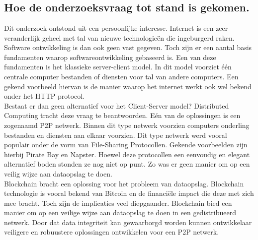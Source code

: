 
\chapter{}
\label{ch:methodologie}

\section{Hoe de onderzoeksvraag tot stand is gekomen.}
\label{POC_introduction}
Dit onderzoek ontstond uit een persoonlijke interesse. Internet is een zeer veranderlijk geheel met tal van nieuwe technologieën die ingeburgerd raken. Software ontwikkeling is dan ook geen vast gegeven. Toch zijn er een aantal basis fundamenten waarop softwareontwikkeling gebaseerd is. Een van deze fundamenten is het klassieke server-client model. In dit model voorziet één centrale computer bestanden of diensten voor tal van andere computers. Een gekend voorbeeld hiervan is de manier waarop het internet werkt ook wel bekend onder het HTTP protocol.\\

Bestaat er dan geen alternatief voor het Client-Server model? Distributed Computing tracht deze vraag te beantwoorden. Eén van de oplossingen is een zogenaamd P2P netwerk. Binnen dit type netwerk voorzien computers onderling bestanden en diensten aan elkaar voorzien. Dit type netwerk werd vooral populair onder de vorm van File-Sharing Protocollen. Gekende voorbeelden zijn hierbij Pirate Bay en Napster. Hoewel deze protocollen een eenvoudig en elegant alternatief boden stonden ze nog niet op punt. Zo was er geen manier om op een veilig wijze aan dataopslag te doen.\\

Blockchain bracht een oplossing voor het probleem van dataopslag. Blockchain technologie is vooral bekend van Bitcoin en de financiële impact die deze met zich mee bracht. Toch zijn de implicaties veel diepgaander. Blockchain bied een manier om op een veilige wijze aan dataopslag te doen in een gedistribueerd netwerk. Door dat data integriteit kan gewaarborgd worden kunnen ontwikkelaar veiligere en robuustere oplossingen ontwikkelen voor een P2P netwerk.\\

